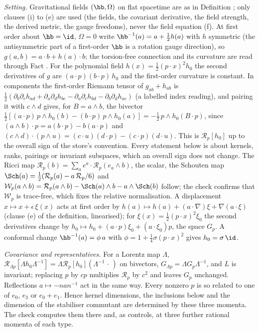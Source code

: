 \emph{Setting.} Gravitational fields $(\hb, \Omega)$ on flat spacetime are as in Definition ; only clauses (i) to (e) are used (the fields, the covariant derivative, the field strength, the derived metric, the gauge freedoms), never the field equation (f). At first order about $\hb = \id$, $\Omega = 0$ write $\hb^{-1}(a) = a + \tfrac12 h(a)$ with $h$ symmetric (the antisymmetric part of a first-order $\hb$ is a rotation gauge direction), so $g(a, b) = a \cdot b + h(a) \cdot b$; the torsion-free connection and its curvature are read through Fact . For the polynomial field $h(x) = \tfrac12 (p \cdot x)^{2}h_{0}$ the second derivatives of $g$ are $(a \cdot p)(b \cdot p)\,h_{0}$ and the first-order curvature is constant. In components the first-order Riemann tensor of $g_{ab} + h_{ab}$ is $\tfrac12(\partial_{b}\partial_{c}h_{ad} + \partial_{a}\partial_{d}h_{bc} - \partial_{a}\partial_{c}h_{bd} - \partial_{b}\partial_{d}h_{ac})$ (a labelled index reading), and pairing it with $c \wedge d$ gives, for $B = a \wedge b$, the bivector $\tfrac12[(a \cdot p)\,p \wedge h_{0}(b) - (b \cdot p)\,p \wedge h_{0}(a)] = -\tfrac12\,p \wedge h_{0}(B \cdot p)$, since $(a \wedge b) \cdot p = a(b \cdot p) - b(a \cdot p)$ and $(c \wedge d) \cdot (p \wedge u) = (c \cdot u)(d \cdot p) - (c \cdot p)(d \cdot u)$. This is $\mathcal{R}_{p}[h_{0}]$ up to the overall sign of the store's convention. Every statement below is about kernels, ranks, pairings or invariant subspaces, which an overall sign does not change. The Ricci map $\mathcal{R}_{p}(b) = \sum_{a} e^{a} \cdot \mathcal{R}_{p}(e_{a} \wedge b)$, the scalar, the Schouten map $\Sch(a) = \tfrac12(\mathcal{R}_{p}(a) - a\,\mathcal{R}_{p}/6)$ and $\mathcal{W}_{p}(a \wedge b) = \mathcal{R}_{p}(a \wedge b) - \Sch(a) \wedge b - a \wedge \Sch(b)$ follow; the check confirms that $\mathcal{W}_{p}$ is trace-free, which fixes the relative normalisation. A displacement $x \mapsto x + \epsilon\,\xi(x)$ acts at first order by $h(a) \mapsto h(a) + (a \cdot \nabla)\xi + \nabla(a \cdot \xi)$ (clause (e) of the definition, linearised); for $\xi(x) = \tfrac12 (p \cdot x)^{2}\xi_{0}$ the second derivatives change by $h_{0} \mapsto h_{0} + (a \cdot p)\xi_{0} + (a \cdot \xi_{0})p$, the space $G_{p}$. A conformal change $\hb^{-1}(a) = \phi\,a$ with $\phi = 1 + \tfrac14\sigma(p \cdot x)^{2}$ gives $h_{0} = \sigma\,\id$.

\emph{Covariance and representatives.} For a Lorentz map $\Lambda$, $\mathcal{R}_{\Lambda p}[\Lambda h_{0}\Lambda^{-1}] = \Lambda \mathcal{R}_{p}[h_{0}](\Lambda^{-1}\,\cdot\,)$ on bivectors, $G_{\Lambda p} = \Lambda G_{p}\Lambda^{-1}$, and $L$ is invariant; replacing $p$ by $cp$ multiplies $\mathcal{R}_{p}$ by $c^{2}$ and leaves $G_{p}$ unchanged. Reflections $a \mapsto -n a n^{-1}$ act in the same way. Every nonzero $p$ is so related to one of $e_{0}$, $e_{3}$ or $e_{0} + e_{1}$. Hence kernel dimensions, the inclusions below and the dimension of the stabiliser commutant are determined by these three momenta. The check computes them there and, as controls, at three further rational momenta of each type.

